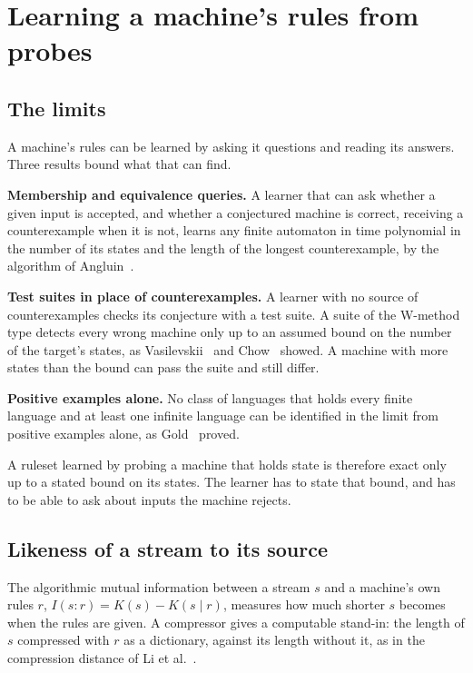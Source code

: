 \chapter{\texorpdfstring{Learning a machine's rules from probes}{Learning a machine's rules from probes}}
\label{chap:learning-a-ruleset}

\section{\texorpdfstring{The limits}{The limits}}

A machine's rules can be learned by asking it questions and reading its answers. Three results bound what that can find.

\textbf{Membership and equivalence queries.} A learner that can ask whether a given input is accepted, and whether a conjectured machine is correct, receiving a counterexample when it is not, learns any finite automaton in time polynomial in the number of its states and the length of the longest counterexample, by the algorithm of Angluin~\cite{src:Angluin-1987}.

\textbf{Test suites in place of counterexamples.} A learner with no source of counterexamples checks its conjecture with a test suite. A suite of the W-method type detects every wrong machine only up to an assumed bound on the number of the target's states, as Vasilevskii~\cite{src:Vasilevskii-1973} and Chow~\cite{src:Chow-1978} showed. A machine with more states than the bound can pass the suite and still differ.

\textbf{Positive examples alone.} No class of languages that holds every finite language and at least one infinite language can be identified in the limit from positive examples alone, as Gold~\cite{src:Gold-1967} proved.

A ruleset learned by probing a machine that holds state is therefore exact only up to a stated bound on its states. The learner has to state that bound, and has to be able to ask about inputs the machine rejects.

\section{\texorpdfstring{Likeness of a stream to its source}{Likeness of a stream to its source}}

The algorithmic mutual information between a stream \(s\) and a machine's own rules \(r\), \(I(s : r) = K(s) - K(s \mid r)\), measures how much shorter \(s\) becomes when the rules are given. A compressor gives a computable stand-in: the length of \(s\) compressed with \(r\) as a dictionary, against its length without it, as in the compression distance of Li et al.~\cite{src:Li-2004}.

